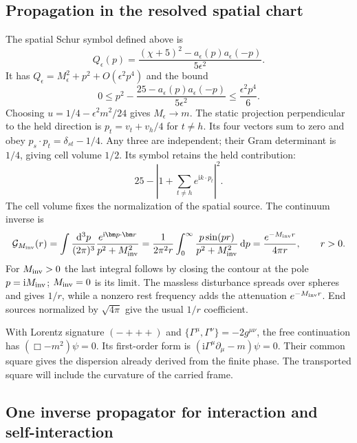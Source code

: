 \documentclass[aps,prx,onecolumn,10pt,notitlepage,nofootinbib,longbibliography]{revtex4-2}
\numberwithin{equation}{section}
\numberwithin{table}{section}
\newcommand{\dd}{\mathrm d}
\newcommand{\ii}{\mathrm i}
\begin{document}
\subsection{Propagation in the resolved spatial chart}
The spatial Schur symbol defined above is
\begin{equation}
 Q_\epsilon(p)=\frac{(\chi+5)^2-a_\epsilon(p)a_\epsilon(-p)}{5\epsilon^2}.
 \label{eq:spatialsymbol}
\end{equation}
It has $Q_\epsilon=M_\epsilon^2+p^2+O(\epsilon^2p^4)$ and the bound
\begin{equation}
 0\leq p^2-\frac{25-a_\epsilon(p)a_\epsilon(-p)}{5\epsilon^2}
 \leq\frac{\epsilon^2p^4}{6}.
\end{equation}
Choosing $u=1/4-\epsilon^2m^2/24$ gives $M_\epsilon\to m$. The static projection perpendicular to the held direction is $p_t=v_t+v_h/4$ for $t\ne h$. Its four vectors sum to zero and obey $p_s\cdot p_t=\delta_{st}-1/4$. Any three are independent; their Gram determinant is $1/4$, giving cell volume $1/2$. Its symbol retains the held contribution:
\begin{equation}
 25-\left|1+\sum_{t\ne h}e^{\ii k\cdot p_t}\right|^2.
\end{equation}
The cell volume fixes the normalization of the spatial source. The continuum inverse is
\begin{equation}
 \mathcal G_{M_{\rm inv}}(r)=\int\frac{\dd^3p}{(2\pi)^3}\frac{e^{\ii\bm p\cdot\bm r}}{p^2+M_{\rm inv}^2}
 =\frac1{2\pi^2r}\int_0^\infty\frac{p\sin(pr)}{p^2+M_{\rm inv}^2}\,\dd p
 =\frac{e^{-M_{\rm inv}r}}{4\pi r},\qquad r>0.
 \label{eq:continuumgreen}
\end{equation}
For $M_{\rm inv}>0$ the last integral follows by closing the contour at the pole $p=\ii M_{\rm inv}$; $M_{\rm inv}=0$ is its limit. The massless disturbance spreads over spheres and gives $1/r$, while a nonzero rest frequency adds the attenuation $e^{-M_{\rm inv}r}$. End sources normalized by $\sqrt{4\pi}$ give the usual $1/r$ coefficient.

With Lorentz signature $(-+++)$ and $\{\Gamma^\mu,\Gamma^\nu\}=-2g^{\mu\nu}$, the free continuation has $(\Box-m^2)\psi=0$. Its first-order form is $(\ii\Gamma^\mu\partial_\mu-m)\psi=0$. Their common square gives the dispersion already derived from the finite phase. The transported square will include the curvature of the carried frame.

\subsection{One inverse propagator for interaction and self-interaction}
\label{sec:common}
\end{document}
